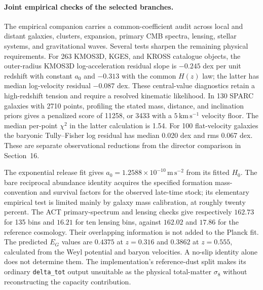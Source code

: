 \paragraph{Joint empirical checks of the selected branches.}
The empirical companion carries a common-coefficient audit across local
and distant galaxies, clusters, expansion, primary CMB spectra, lensing,
stellar systems, and gravitational waves. Several tests sharpen the
remaining physical requirements. For 263 KMOS3D, KGES, and KROSS catalogue
objects, the outer-radius KMOS3D log-acceleration residual slope is
$-0.245$ dex per unit redshift with constant $a_0$ and $-0.313$ with the
common $H(z)$ law; the latter has median log-velocity residual $-0.087$ dex.
These central-value diagnostics retain a high-redshift tension and require
a resolved kinematic likelihood. In 130 SPARC galaxies with 2710 points,
profiling the stated mass, distance, and inclination priors gives a
penalized score of 11258, or 3433 with a $5\,\mathrm{km\,s^{-1}}$ velocity
floor. The median per-point $\chi^2$ in the latter calculation is 1.54.
For 100 flat-velocity galaxies the baryonic Tully--Fisher log residual has
median 0.020 dex and rms 0.067 dex. These are separate observational
reductions from the director comparison in Section~16.

The exponential release fit gives
$a_0=1.2588\times10^{-10}\,\mathrm{m\,s^{-2}}$ from its fitted $H_0$.
The bare reciprocal abundance identity acquires the specified formation
mass-convention and survival factors for the observed late-time stock;
its elementary empirical test is limited mainly by galaxy mass calibration,
at roughly twenty percent. The ACT primary-spectrum and lensing checks
give respectively $162.73$ for 135 bins and $16.21$ for ten lensing bins,
against $162.02$ and $17.86$ for the reference cosmology. Their overlapping
information is not added to the Planck fit. The predicted $E_G$ values
are $0.4375$ at $z=0.316$ and $0.3862$ at $z=0.555$, calculated from
the Weyl potential and baryon velocities. A no-slip identity alone does
not determine them. The implementation's reference-dust split makes its
ordinary \texttt{delta\_tot} output unsuitable as the physical total-matter
$\sigma_8$ without reconstructing the capacity contribution.

